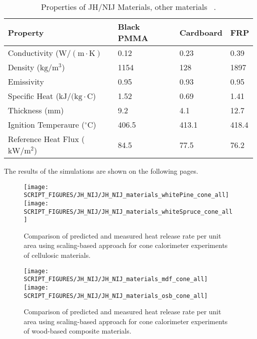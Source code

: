 \begin{table}[!h]
\caption[Properties of JH/NIJ Materials, other materials]{Properties of JH/NIJ Materials, other materials ~\cite{Lattimer:NIJ19}.}
\centering
\begin{tabular}{|l|p{1.4cm}|p{1.4cm}|p{1.4cm}|}
\hline
Property                                       &     Black PMMA   &     Cardboard  &  FRP      \\ \hline
Conductivity        ($\mathrm{W/(m\cdot K)}$   &  0.12            &   0.23         &  0.39     \\ \hline
Density             ($\mathrm{kg/m^{3}}$)      &  1154            &   128          &  1897     \\ \hline
Emissivity                                     &  0.95            &   0.93         &  0.95     \\ \hline
Specific Heat       ($\mathrm{kJ/(kg\cdot C}$) &  1.52            &   0.69         &  1.41     \\ \hline
Thickness           ($\mathrm{mm}$)            &  9.2             &   4.1          &  12.7     \\ \hline
Ignition Temperaure ($\mathrm{^{\circ}C}$)     &  406.5           &   413.1        &  418.4    \\ \hline
Reference Heat Flux ($\mathrm{kW/m^{2}}$)      &  84.5            &   77.5         &  76.2     \\ \hline
\end{tabular}
\label{Properties_JH_NIJ_Materials_others}
\end{table}

The results of the simulations are shown on the following pages.

\begin{figure}[h!]
\texttt{[image: SCRIPT\_FIGURES/JH\_NIJ/JH\_NIJ\_materials\_whitePine\_cone\_all]} \\
\texttt{[image: SCRIPT\_FIGURES/JH\_NIJ/JH\_NIJ\_materials\_whiteSpruce\_cone\_all]} \\
\caption[Heat release rate per unit area of JH/NIJ materials using scaling model, cellulosic materials]
{Comparison of predicted and measured heat release rate per unit area using scaling-based approach for cone calorimeter experiments of cellulosic materials.}
\label{JH_NIJ_HRR_cellulosic}
\end{figure}

\begin{figure}[h!]
\texttt{[image: SCRIPT\_FIGURES/JH\_NIJ/JH\_NIJ\_materials\_mdf\_cone\_all]} \\
\texttt{[image: SCRIPT\_FIGURES/JH\_NIJ/JH\_NIJ\_materials\_osb\_cone\_all]} \\
\caption[Heat release rate per unit area of JH/NIJ materials using scaling model, wood-based composite materials]
{Comparison of predicted and measured heat release rate per unit area using scaling-based approach for cone calorimeter experiments of wood-based composite materials.}
\label{JH_NIJ_HRR_composite}
\end{figure}

